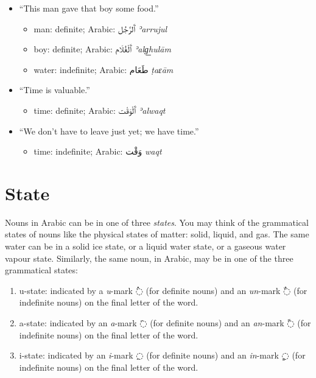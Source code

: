 \documentclass[
  10pt,
]{book}
\providecommand{\tightlist}{%
  \setlength{\itemsep}{0pt}\setlength{\parskip}{0pt}}
\begin{document}
\begin{itemize}
\tightlist
\item
  \enquote{This man gave that boy some food.}

  \begin{itemize}
  \tightlist
  \item
    man: definite; Arabic: \foreignlanguage{arabic}{ٱَلرَّجُل} \emph{ʾarrujul}
  \item
    boy: definite; Arabic: \foreignlanguage{arabic}{ٱَلْغُلَام} \emph{ʾalg͟hulām}
  \item
    water: indefinite; Arabic: \foreignlanguage{arabic}{طَعَام} \emph{ṭaɛām}
  \end{itemize}
\item
  \enquote{Time is valuable.}

  \begin{itemize}
  \tightlist
  \item
    time: definite; Arabic: \foreignlanguage{arabic}{ٱَلْوَقْت} \emph{ʾalwaqt}
  \end{itemize}
\item
  \enquote{We don't have to leave just yet; we have time.}

  \begin{itemize}
  \tightlist
  \item
    time: indefinite; Arabic: \foreignlanguage{arabic}{وَقْت} \emph{waqt}
  \end{itemize}
\end{itemize}

\section{State}\label{state}

Nouns in Arabic can be in one of three \emph{states}. You may think of the grammatical states of nouns like the physical states of matter: solid, liquid, and gas. The same water can be in a solid ice state, or a liquid water state, or a gaseous water vapour state. Similarly, the same noun, in Arabic, may be in one of the three grammatical states:

\begin{enumerate}
\def\labelenumi{\arabic{enumi}.}
\tightlist
\item
  u-state: indicated by a \emph{u}-mark \foreignlanguage{arabic}{◌ُ} (for definite nouns) and an \emph{un}-mark \foreignlanguage{arabic}{◌ٌ} (for indefinite nouns) on the final letter of the word.
\item
  a-state: indicated by an \emph{a}-mark \foreignlanguage{arabic}{◌َ} (for definite nouns) and an \emph{an}-mark \foreignlanguage{arabic}{◌ً} (for indefinite nouns) on the final letter of the word.
\item
  i-state: indicated by an \emph{i}-mark \foreignlanguage{arabic}{◌ِ} (for definite nouns) and an \emph{in}-mark \foreignlanguage{arabic}{◌ٍ} (for indefinite nouns) on the final letter of the word.
\end{enumerate}
\end{document}
